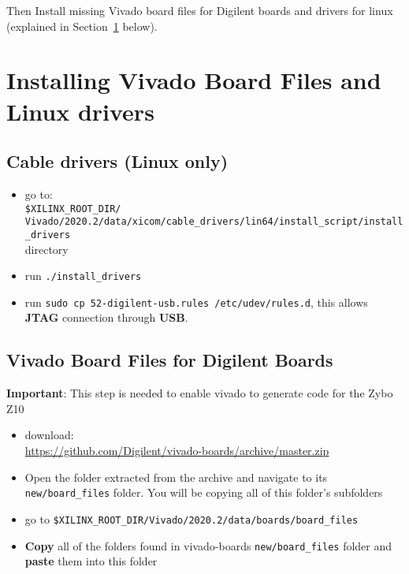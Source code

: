 Then Install missing Vivado board files for Digilent boards and drivers for linux (explained in Section~\ref{board-file-install} below).





\section{Installing Vivado Board Files and Linux drivers}
\label{board-file-install}

\subsection{Cable drivers (Linux only)}
\label{sec-udev}
\begin{itemize}
\item
  go to:\\
  \texttt{\$XILINX\_ROOT\_DIR/}\\
  \texttt{Vivado/2020.2/data/xicom/cable\_drivers/lin64/install\_script/install\_drivers}\\
  directory
\item
  run \texttt{./install\_drivers}
\item
  run \texttt{sudo\ cp\ 52-digilent-usb.rules\ /etc/udev/rules.d}, this
  allows \textbf{JTAG} connection through \textbf{USB}.
\end{itemize}

\subsection{Vivado Board Files for Digilent Boards}
{\bf Important}: This step is needed to enable vivado to generate code for the Zybo Z10

\begin{itemize}
\item
  download:\\
\href{https://github.com/Digilent/vivado-boards/archive/master.zip?\_ga=2.76732885.1953828090.1655988025-1125947215.1655988024}{https://github.com/Digilent/vivado-boards/archive/master.zip}
\item
  Open the folder extracted from the archive and navigate to its
  \texttt{new/board\_files} folder. You will be copying all of this
  folder's subfolders
\item
  go to
  \texttt{\$XILINX\_ROOT\_DIR/Vivado/2020.2/data/boards/board\_files}
\item
  \textbf{Copy} all of the folders found in vivado-boards
  \texttt{new/board\_files} folder and \textbf{paste} them into this
  folder
\end{itemize}

